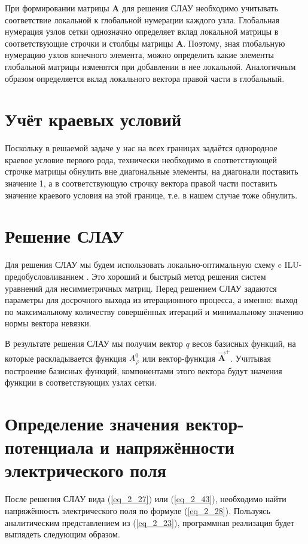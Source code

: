 При формировании матрицы \textbf{A} для решения СЛАУ необходимо учитывать соответствие локальной к глобальной нумерации каждого узла. Глобальная нумерация узлов сетки однозначно определяет вклад локальной матрицы в соответствующие строчки и столбцы матрицы \textbf{A}. Поэтому, зная глобальную нумерацию узлов конечного элемента, можно определить какие элементы глобальной матрицы изменятся при добавлении в нее локальной. Аналогичным образом определяется вклад локального вектора правой части в глобальный.

\section{Учёт краевых условий}

Поскольку в решаемой задаче у нас на всех границах задаётся однородное краевое условие первого рода, технически необходимо в соответствующей строчке матрицы обнулить вне диагональные элементы, на диагонали поставить значение 1, а в соответствующую строчку вектора правой части поставить значение краевого условия на этой границе, т.е. в нашем случае тоже обнулить.

\section{Решение СЛАУ}

Для решения СЛАУ мы будем использовать локально-оптимальную схему c ILU-предобусловливанием \cite{9}. Это хороший и быстрый метод решения систем уравнений для несимметричных матриц. Перед решением СЛАУ задаются параметры для досрочного выхода из итерационного процесса, а именно: выход по максимальному количеству совершённых итераций и минимальному значению нормы вектора невязки.

В результате решения СЛАУ мы получим вектор $q$ весов базисных функций, на которые раскладывается функция $A_{\varphi}^0$ или вектор-функция $\overrightarrow{\textbf{A}}^{+}$. Учитывая построение базисных функций, компонентами этого вектора будут значения функции в соответствующих узлах сетки.

\section{Определение значения вектор-потенциала и напряжённости электрического поля}

После решения СЛАУ вида (\ref{eq_2_27}) или (\ref{eq_2_43}), необходимо найти напряжённость электрического поля по формуле (\ref{eq_2_28}). Пользуясь аналитическим представлением из (\ref{eq_2_23}), программная реализация будет выглядеть следующим образом.


